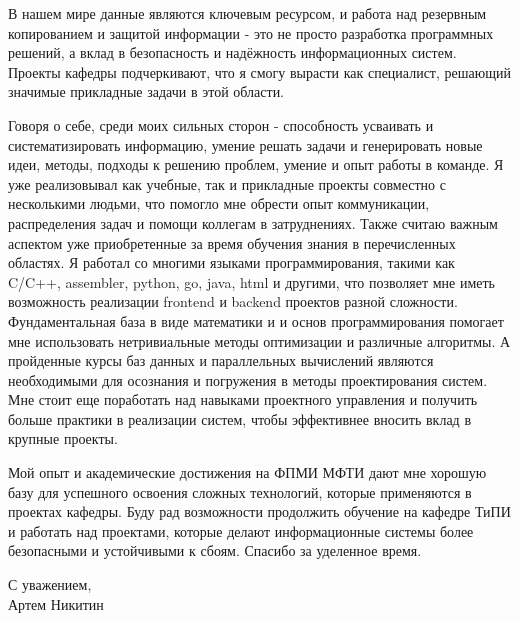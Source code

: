 \quad В нашем мире данные являются ключевым ресурсом, и работа над резервным копированием и защитой информации - это не просто разработка
программных решений, а вклад в безопасность и надёжность информационных систем. Проекты кафедры подчеркивают, что я смогу вырасти как
специалист, решающий значимые прикладные задачи в этой области.

\quad Говоря о себе, среди моих сильных сторон - способность усваивать и систематизировать информацию, умение решать задачи и генерировать
новые идеи, методы, подходы к решению проблем, умение и опыт работы в команде. Я уже реализовывал как учебные, так и прикладные проекты
совместно с несколькими людьми, что помогло мне обрести опыт коммуникации, распределения задач и помощи коллегам в затруднениях. Также считаю
важным аспектом уже приобретенные за время обучения знания в перечисленных областях. Я работал со многими языками программирования, такими как
C/C++, assembler, python, go, java, html и другими, что позволяет мне иметь возможность реализации frontend и backend проектов разной
сложности. Фундаментальная база в виде математики и и основ программирования помогает мне использовать нетривиальные методы оптимизации и
различные алгоритмы. А пройденные курсы баз данных и параллельных вычислений являются необходимыми для осознания и погружения в методы
проектирования систем. Мне стоит еще поработать над навыками проектного управления и получить больше практики в реализации систем, чтобы
эффективнее вносить вклад в крупные проекты.

\quad Мой опыт и академические достижения на ФПМИ МФТИ дают мне хорошую базу для успешного освоения сложных технологий, которые применяются в
проектах кафедры. Буду рад возможности продолжить обучение на кафедре ТиПИ и работать над проектами, которые делают информационные системы
более безопасными и устойчивыми к сбоям. Спасибо за уделенное время.

\begin{flushright}
    С уважением, \\
    Артем Никитин
\end{flushright}
